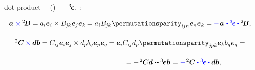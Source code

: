   dot product\:---   ()\:---  ~${^3\hspace{-0.25ex}\bm{\epsilon}}\hspace{.05ex}$.
  :

\nopagebreak\vspace{-0.1em}\begin{equation*}
\begin{array}{c}
\bm{a} \hspace{.1ex} \mathcolor{blue}{\times} {^2\hspace{-0.16em}\bm{B}} = a_i \bm{e}_i \times B_{\hspace{-0.1ex}j\hspace{-0.1ex}k} \bm{e}_j \bm{e}_k \hspace{-0.1ex} = \tikzmark{BeginVectorCrossTensor} a_i B_{\hspace{-0.1ex}j\hspace{-0.1ex}k} \hspace{.1ex} \permutationsparity_{i\hspace{-0.1ex}jn} \tikzmark{EndVectorCrossTensor} \bm{e}_n \bm{e}_k = \mathcolor{blue}{-} \hspace{.2ex} \bm{a} \hspace{.15ex} \mathcolor{blue}{\dotp \permutationsparitytensor \dotp} {^2\!\bm{B}} ,
\\[1.6em]
%
{^2\hspace{-0.05ex}\bm{C}} \mathcolor{blue}{\times} \hspace{-0.1ex} \bm{d} \bm{b} = C_{i\hspace{-0.1ex}j} \bm{e}_i \bm{e}_j \hspace{-0.1ex} \times d_p b_q \bm{e}_p \bm{e}_q \hspace{-0.1ex} = \bm{e}_i C_{i\hspace{-0.1ex}j} d_p \tikzmark{BeginTensorCrossTensor} \permutationsparity_{j\hspace{-0.1ex}pk} \tikzmark{EndTensorCrossTensor} \bm{e}_k b_q \bm{e}_q =
\\[1.6em]
\hspace{12.5em} =
- \hspace{.2ex} {^2\hspace{-0.05ex}\bm{C}} \hspace{-0.1ex} \bm{d} \hspace{.12ex} \dotdotp \permutationsparitytensor \hspace{.1ex} \bm{b} \hspace{.2ex} =
\mathcolor{blue}{-} \hspace{.2ex} {^2\hspace{-0.05ex}\bm{C}} \mathcolor{blue}{\dotp \permutationsparitytensor \dotp} \bm{d} \bm{b} ,
\\
\end{array}
\end{equation*}%

